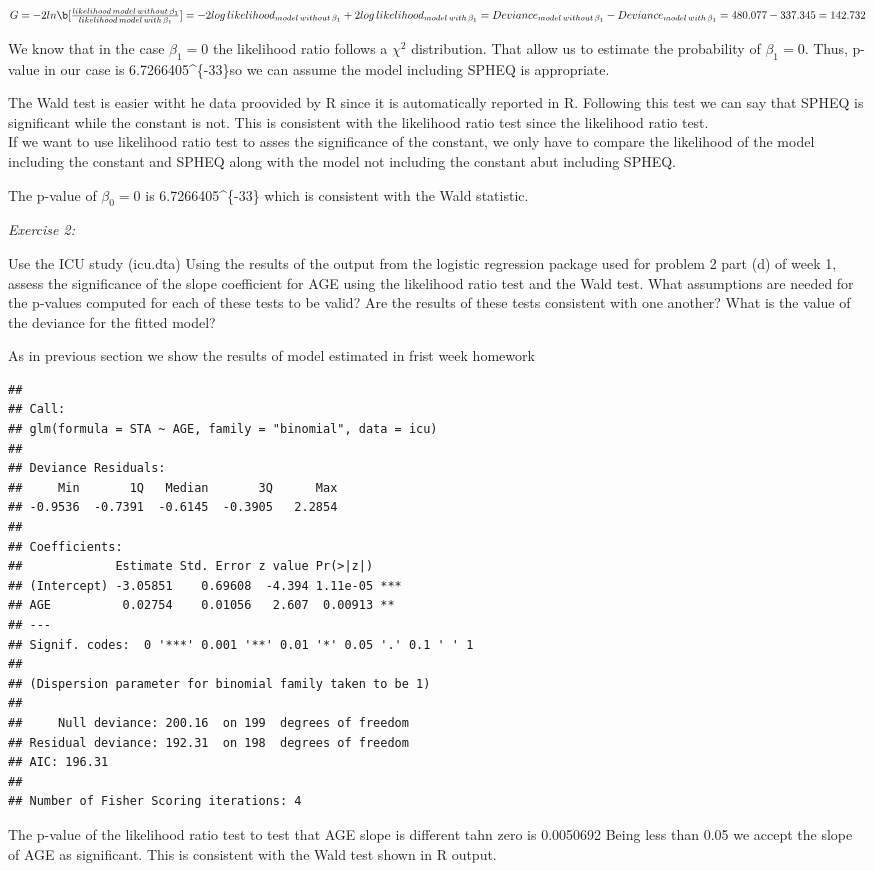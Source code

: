 \documentclass[]{article}
\begin{document}
$G=-2ln\b[\frac{likelihood\,model\,without\,\beta_1}{likelihood\,model\,with\,\beta_1}]=-2log\,likelihood_{model\,without\,\beta_1}+2log\,likelihood_{model\,with\,\beta_1}=Deviance_{model\,without\,\beta_1}-Deviance_{model\,with\,\beta_1}=480.077-337.345=142.732$

We know that in the case $\beta_1=0$ the likelihood ratio follows a
$\chi^2$ distribution. That allow us to estimate the probability of
$\beta_1=0$. Thus, p-value in our case is
6.7266405\^{}\{-33\}so we can assume the model including SPHEQ
is appropriate.

The Wald test is easier witht he data proovided by R since it is
automatically reported in R. Following this test we can say that SPHEQ
is significant while the constant is not. This is consistent with the
likelihood ratio test since the likelihood ratio test.\\If we want to
use likelihood ratio test to asses the significance of the constant, we
only have to compare the likelihood of the model including the constant
and SPHEQ along with the model not including the constant abut including
SPHEQ.

The p-value of $\beta_0=0$ is 6.7266405\^{}\{-33\} which is
consistent with the Wald statistic.

\emph{Exercise 2:}

Use the ICU study (icu.dta) Using the results of the output from the
logistic regression package used for problem 2 part (d) of week 1,
assess the significance of the slope coefficient for AGE using the
likelihood ratio test and the Wald test. What assumptions are needed for
the p-values computed for each of these tests to be valid? Are the
results of these tests consistent with one another? What is the value of
the deviance for the fitted model?

As in previous section we show the results of model estimated in frist
week homework

\begin{verbatim}
## 
## Call:
## glm(formula = STA ~ AGE, family = "binomial", data = icu)
## 
## Deviance Residuals: 
##     Min       1Q   Median       3Q      Max  
## -0.9536  -0.7391  -0.6145  -0.3905   2.2854  
## 
## Coefficients:
##             Estimate Std. Error z value Pr(>|z|)    
## (Intercept) -3.05851    0.69608  -4.394 1.11e-05 ***
## AGE          0.02754    0.01056   2.607  0.00913 ** 
## ---
## Signif. codes:  0 '***' 0.001 '**' 0.01 '*' 0.05 '.' 0.1 ' ' 1
## 
## (Dispersion parameter for binomial family taken to be 1)
## 
##     Null deviance: 200.16  on 199  degrees of freedom
## Residual deviance: 192.31  on 198  degrees of freedom
## AIC: 196.31
## 
## Number of Fisher Scoring iterations: 4
\end{verbatim}

The p-value of the likelihood ratio test to test that AGE slope is
different tahn zero is 0.0050692 Being less than 0.05 we accept the
slope of AGE as significant. This is consistent with the Wald test shown
in R output.
\end{document}
